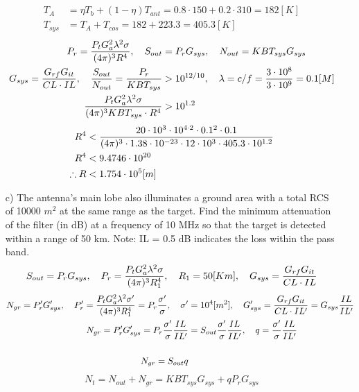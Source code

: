 \documentclass[12pt, letterpaper]{article}
\begin{document}
\begin{itemize}
\begin{align*}
    \\
    T_A&=\eta T_b+(1-\eta)T_{ant}=0.8\cdot150+0.2\cdot310=182[K]
    \\
    T_{sys}&=T_A+T_{cos}=182+223.3=405.3[K]
  \end{align*}
  \begin{align*}
    P_r={P_tG_a^2\lambda^2\sigma\over(4\pi)^3R^4}, \quad S_{out}&=P_rG_{sys}, \quad N_{out}=KBT_{sys}G_{sys}
    \\
    G_{sys}={G_{rf}G_{it}\over CL\cdot IL}, \quad {S_{out}\over N_{out}}={P_r\over KBT_{sys}}&>10^{12/10}, \quad \lambda=c/f={3\cdot10^8\over3\cdot10^9}=0.1[M]
    \\
    {P_tG_a^2\lambda^2\sigma\over(4\pi)^3KBT_{sys}\cdot R^4}&>10^{1.2}
  \end{align*}
  \begin{align*}
    R^4&<{20\cdot10^3\cdot10^{4\cdot2}\cdot0.1^2\cdot0.1\over(4\pi)^3\cdot1.38\cdot10^{-23}\cdot12\cdot10^3\cdot405.3\cdot10^{1.2}}
    \\
    R^4&<9.4746\cdot10^{20}
    \\
    \therefore
    R&<1.754\cdot10^5[m]
  \end{align*}
  \item [c)] The antenna's main lobe also illuminates a ground area with a total RCS of 10000 $m^2$ at the same range as the target. Find the minimum attenuation of the filter (in dB) at a frequency of 10 MHz so that the target is detected within a range of 50 km. Note: IL = 0.5 dB indicates the loss within the pass band.
  \begin{align*}
    S_{out}=P_rG_{sys}, \quad P_r={P_tG_a^2\lambda^2\sigma\over(4\pi)^3R_1^4}, \quad R_1=50[Km], \quad G_{sys}={G_{rf}G_{it}\over CL\cdot IL}
  \end{align*}
  \begin{align*}
    N_{gr}=P_r'G_{sys}', \quad
    P_r'={P_tG_a^2\lambda^2\sigma'\over(4\pi)^3R_1^4}=P_r{\sigma'\over\sigma}, \quad
    \sigma'&=10^4[m^2], \quad
    G_{sys}'= {G_{rf}G_{it}\over CL\cdot IL'}=G_{sys}{IL\over IL'}
    \\
    N_{gr}=P_r'G_{sys}'=P_r{\sigma'\over \sigma}{IL\over IL'}&=S_{out}{\sigma'\over \sigma}{IL\over IL'}, \quad q={\sigma'\over \sigma}{IL\over IL'}
    \\\\
    N_{gr}=S_{out}q
  \end{align*}
  \begin{align*}
    N_t=N_{out}+N_{gr}=KBT_{sys}G_{sys}+qP_rG_{sys}
  \end{align*}

\end{itemize}
\end{document}
